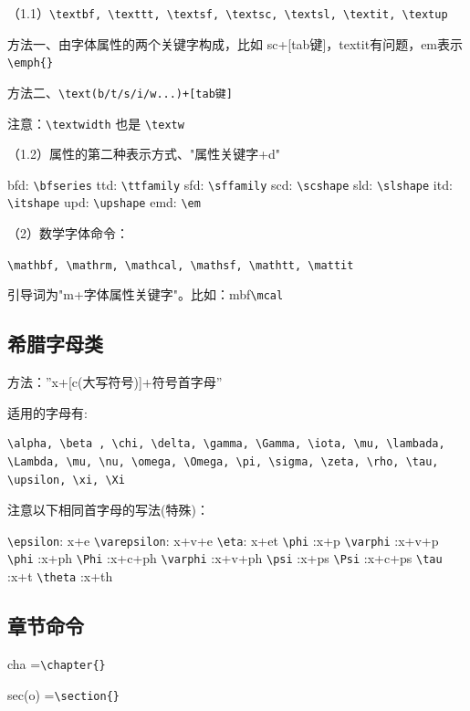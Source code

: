 （1.1）\verb|\textbf, \texttt, \textsf, \textsc, \textsl, \textit, \textup|

   方法一、由字体属性的两个关键字构成，比如 sc+[tab键]，textit有问题，em表示\verb|\emph{}|
   
   方法二、\verb|\text(b/t/s/i/w...)+[tab键]|
   
   注意：\verb|\textwidth| 也是 \verb|\textw|

（1.2）属性的第二种表示方式、"属性关键字+d"

    bfd: \verb|\bfseries|
    ttd: \verb|\ttfamily|
    sfd: \verb|\sffamily|
    scd: \verb|\scshape|
    sld:  \verb|\slshape|
    itd:  \verb|\itshape|
    upd: \verb|\upshape|
    emd: \verb|\em|
 
（2）数学字体命令：
    
  \verb|\mathbf, \mathrm, \mathcal, \mathsf, \mathtt, \mattit|
  
    引导词为"m+字体属性关键字"。比如：mbf\verb|\mcal|
 

 
 \subsection{希腊字母类}
方法：”x+[c(大写符号)]+符号首字母”

适用的字母有:
\begin{verbatim}
\alpha, \beta , \chi, \delta, \gamma, \Gamma, \iota, \mu, \lambada,
\Lambda, \mu, \nu, \omega, \Omega, \pi, \sigma, \zeta, \rho, \tau,
\upsilon, \xi, \Xi
\end{verbatim}

注意以下相同首字母的写法(特殊)：

\verb|\epsilon|: x+e
\verb|\varepsilon|: x+v+e
\verb|\eta|: x+et
\verb|\phi| :x+p
\verb|\varphi| :x+v+p
\verb|\phi| :x+ph
\verb|\Phi| :x+c+ph
\verb|\varphi| :x+v+ph
\verb|\psi| :x+ps
\verb|\Psi| :x+c+ps
\verb|\tau| :x+t
\verb|\theta| :x+th
 
 
 
 \subsection{章节命令}
cha     =\verb|\chapter{}|

sec(o)   =\verb|\section{}|

